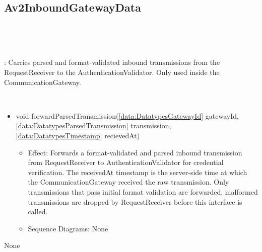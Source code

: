   \subsection{Av2InboundGatewayData}\label{int:InterfacesAv2InboundGatewayData}
    \begin{description}
      \item[Provided by:] \iconcomponent{}~
      \item[Required by:] \iconcomponent{}~ 
           \item[Description]: Carries parsed and format-validated inbound transmissions from the RequestReceiver to the AuthenticationValidator. Only used inside the CommunicationGateway.
      \item[Operations:] ~
    \begin{itemize}[noitemsep,nolistsep,leftmargin=-.25cm]
      \item \textsf{void forwardParsedTransmission(\ref{data:DatatypesGatewayId} gatewayId, \ref{data:DatatypesParsedTransmission} transmission, \ref{data:DatatypesTimestamp} recievedAt)}
        \begin{itemize}[noitemsep,nolistsep]
           \item Effect: Forwards a format-validated and parsed inbound transmission from RequestReceiver to AuthenticationValidator for credential verification. The receivedAt timestamp is the server-side time at which the CommunicationGateway received the raw transmission. Only transmissions that pass initial format validation are forwarded, malformed transmissions are dropped by RequestReceiver before this interface is called. 
           \item Sequence Diagrams: None
        \end{itemize}
    \end{itemize}
      \item[Diagrams:] None
    \end{description}

